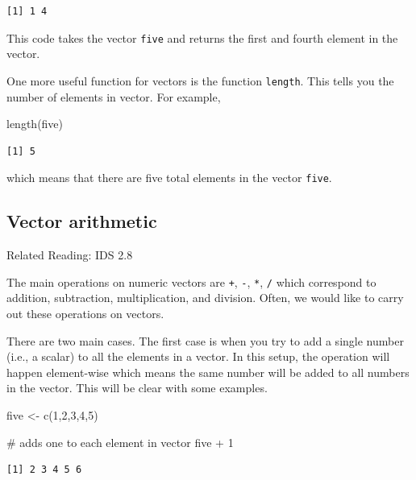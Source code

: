 \documentclass[
  letterpaper,
  DIV=11,
  numbers=noendperiod]{scrreprt}
\newenvironment{Shaded}{\begin{snugshade}}{\end{snugshade}}
\newcommand{\CommentTok}[1]{\textcolor[rgb]{0.37,0.37,0.37}{#1}}
\newcommand{\DecValTok}[1]{\textcolor[rgb]{0.68,0.00,0.00}{#1}}
\newcommand{\FunctionTok}[1]{\textcolor[rgb]{0.28,0.35,0.67}{#1}}
\newcommand{\NormalTok}[1]{\textcolor[rgb]{0.00,0.23,0.31}{#1}}
\newcommand{\OtherTok}[1]{\textcolor[rgb]{0.00,0.23,0.31}{#1}}
\newcommand{\SpecialCharTok}[1]{\textcolor[rgb]{0.37,0.37,0.37}{#1}}
\begin{document}
\begin{verbatim}
[1] 1 4
\end{verbatim}

This code takes the vector \texttt{five} and returns the first and
fourth element in the vector.

One more useful function for vectors is the function \texttt{length}.
This tells you the number of elements in vector. For example,

\begin{Shaded}
\begin{Highlighting}[]
\FunctionTok{length}\NormalTok{(five)}
\end{Highlighting}
\end{Shaded}

\begin{verbatim}
[1] 5
\end{verbatim}

which means that there are five total elements in the vector
\texttt{five}.

\subsection{Vector arithmetic}\label{vector-arithmetic}

Related Reading: IDS 2.8

The main operations on numeric vectors are \texttt{+}, \texttt{-},
\texttt{*}, \texttt{/} which correspond to addition, subtraction,
multiplication, and division. Often, we would like to carry out these
operations on vectors.

There are two main cases. The first case is when you try to add a single
number (i.e., a scalar) to all the elements in a vector. In this setup,
the operation will happen element-wise which means the same number will
be added to all numbers in the vector. This will be clear with some
examples.

\begin{Shaded}
\begin{Highlighting}[]
\NormalTok{five }\OtherTok{\textless{}{-}} \FunctionTok{c}\NormalTok{(}\DecValTok{1}\NormalTok{,}\DecValTok{2}\NormalTok{,}\DecValTok{3}\NormalTok{,}\DecValTok{4}\NormalTok{,}\DecValTok{5}\NormalTok{)}

\CommentTok{\# adds one to each element in vector}
\NormalTok{five }\SpecialCharTok{+} \DecValTok{1}
\end{Highlighting}
\end{Shaded}

\begin{verbatim}
[1] 2 3 4 5 6
\end{verbatim}
\end{document}
